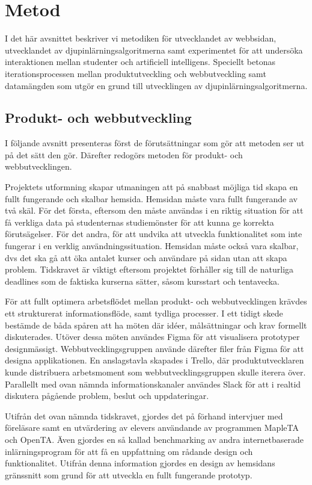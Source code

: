 \chapter{Metod}
I det här avsnittet beskriver vi metodiken för utvecklandet av webbsidan, utvecklandet av djupinlärningsalgoritmerna samt experimentet för att undersöka interaktionen mellan studenter och artificiell intelligens. Speciellt betonas iterationsprocessen mellan produktutveckling och webbutveckling samt datamängden som utgör en grund till utvecklingen av djupinlärningsalgoritmerna.

\section{Produkt- och webbutveckling}

I följande avsnitt presenteras först de förutsättningar som gör att metoden ser ut på det sätt den gör. Därefter redogörs metoden för produkt- och webbutvecklingen.  

Projektets utformning skapar utmaningen att på snabbast möjliga tid skapa en fullt fungerande och skalbar hemsida. Hemsidan måste vara fullt fungerande av två skäl. För det första, eftersom den måste användas i en riktig situation för att få verkliga data på studenternas studiemönster för att kunna ge korrekta förutsägelser. För det andra, för att undvika att utveckla funktionalitet som inte fungerar i en verklig användningssituation. Hemsidan måste också vara skalbar, dvs det ska gå att öka antalet kurser och användare på sidan utan att skapa problem. Tidskravet är viktigt eftersom projektet förhåller sig till de naturliga deadlines som de faktiska kurserna sätter, såsom kursstart och tentavecka. 

För att fullt optimera arbetsflödet mellan produkt- och webbutvecklingen krävdes ett strukturerat informationsflöde, samt tydliga processer. I ett tidigt skede bestämde de båda spåren att ha möten där idéer, målsättningar och krav formellt diskuterades. Utöver dessa möten användes Figma för att visualisera prototyper designmässigt. Webbutvecklingsgruppen använde därefter filer från Figma för att designa applikationen. En anslagstavla skapades i Trello, där produktutvecklaren kunde distribuera arbetsmoment som webbutvecklingsgruppen skulle iterera över. Parallellt med ovan nämnda informationskanaler användes Slack för att i realtid diskutera pågående problem, beslut och uppdateringar.

Utifrån det ovan nämnda tidskravet, gjordes det på förhand intervjuer med föreläsare samt en utvärdering av elevers användande av programmen MapleTA och OpenTA. Även gjordes en så kallad benchmarking av andra internetbaserade inlärningsprogram för att få en uppfattning om rådande design och funktionalitet. Utifrån denna information gjordes en design av hemsidans gränssnitt som grund för att utveckla en fullt fungerande prototyp.

